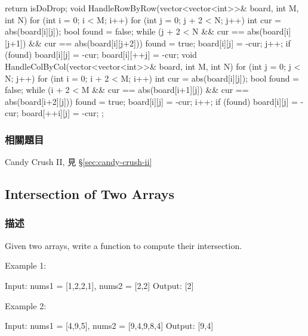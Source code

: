 \begin{Code}
{{        return isDoDrop;
    }
    void HandleRowByRow(vector<vector<int>>& board, int M, int N)
    {
        for (int i = 0; i < M; i++)
        {
            for (int j = 0; j + 2 < N; j++)
            {
                int cur = abs(board[i][j]);
                bool found = false;
                while (j + 2 < N && cur == abs(board[i][j+1]) && cur == abs(board[i][j+2]))
                {
                    found = true;
                    board[i][j] = -cur;
                    j++;
                }
                if (found)
                {
                    board[i][j] = -cur;
                    board[i][++j] = -cur;
                }
            }
        }
    }
    void HandleColByCol(vector<vector<int>>& board, int M, int N)
    {
        for (int j = 0; j < N; j++)
        {
            for (int i = 0; i + 2 < M; i++)
            {
                int cur = abs(board[i][j]);
                bool found = false;
                while (i + 2 < M && cur == abs(board[i+1][j]) && cur == abs(board[i+2][j]))
                {
                    found = true;
                    board[i][j] = -cur;
                    i++;
                }
                if (found)
                {
                    board[i][j] = -cur;
                    board[++i][j] = -cur;
                }
            }
        }
    }
};
\end{Code}

\subsubsection{相關題目}
\begindot
\item Candy Crush II, 見 \S \ref{sec:candy-crush-ii}
\myenddot

\subsection{Intersection of Two Arrays}
\label{sec:intersection-of-two-arrays}


\subsubsection{描述}
Given two arrays, write a function to compute their intersection.

Example 1:
\begin{Code}
Input: nums1 = [1,2,2,1], nums2 = [2,2]
Output: [2]
\end{Code}

Example 2:
\begin{Code}
Input: nums1 = [4,9,5], nums2 = [9,4,9,8,4]
Output: [9,4]
\end{Code}

